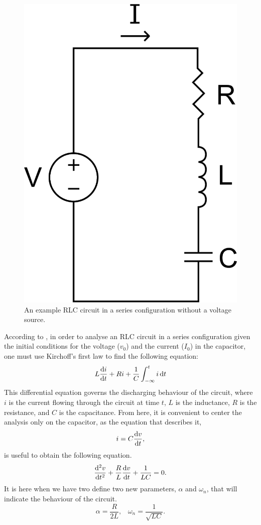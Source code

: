 \documentclass[12pt,twoside]{extarticle}
\begin{document}
\begin{figure}[ht]
    \centering
    \includegraphics[width=0.35\columnwidth]{figures/RLC_series.png}
    \caption{An example RLC circuit in a series configuration without a voltage source.}
    \label{fig:seriesRLC}
\end{figure}
According to \cite{bobrow1983analisis}, in order to analyse an RLC circuit in a series configuration given the initial conditions for the voltage ($v_0$) and the current ($I_0$) in the capacitor, one must use Kirchoff's first law  to find the following equation:
\begin{equation}
    L\dv{i}{t} + Ri + \frac{1}{C} \int_{-\infty}^t i \dd{t}
\end{equation}
This differential equation governs the discharging behaviour of the circuit, where $i$ is the current flowing through the circuit at time $t$, $L$ is the inductance, $R$ is the resistance, and $C$ is the capacitance. From here, it is convenient to center the analysis only on the capacitor, as the equation that describes it,
\begin{equation}\label{eq:cap}
    i=C\dv{v}{t},
\end{equation}
is useful to obtain the following equation.
\begin{equation}
    \dv[2]{v}{t}+\frac{R}{L}\dv{v}{t} + \frac{1}{LC} = 0.
\end{equation}
It is here when we have two define two new parameters, $\alpha$ and $\omega_n$, that will indicate the behaviour of the circuit.
\begin{equation}
    \alpha = \frac{R}{2L}, \,\,\,\,\,
    \omega_n = \frac{1}{\sqrt{LC}}.
\end{equation}
\end{document}
